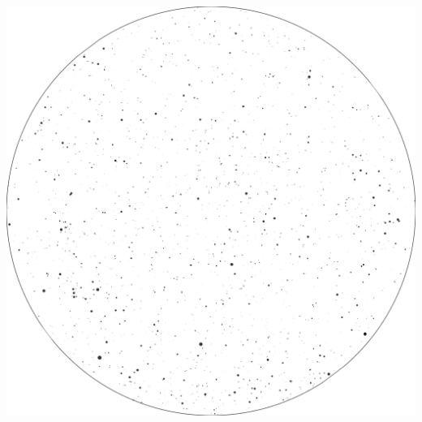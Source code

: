 \documentclass{./SAS-class-skygen}
\begin{document}
	\vspace{0.5cm}
    \begin{center}
    \includegraphics[width=\textwidth]{./pics/skychart18.png}
    \end{center}
    
    
\end{document}
